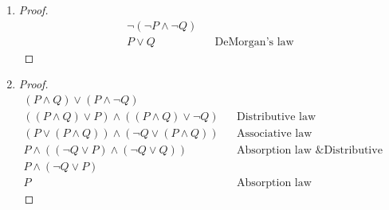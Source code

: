     
    \begin{solution}
        \begin{enumerate}[label=(\alph*)]
            \item {
                \begin{proof}
                    \begin{align*}
                        \neg(\neg P \wedge \neg Q) \\
                        P \vee Q && \text{DeMorgan's law}
                    \end{align*}
                \end{proof}
            }
            
            \item {
                \begin{proof}
                    \begin{align*}
                        (P \wedge Q) \vee (P \wedge \neg Q) \\
                        ((P \wedge Q) \vee P) \wedge ((P \wedge Q) \vee \neg Q) && \text{Distributive law} \\
                        (P \vee (P \wedge Q)) \wedge (\neg Q \vee (P \wedge Q)) && \text{Associative law} \\
                        P \wedge (( \neg Q \vee P) \wedge (\neg Q \vee Q)) && \text{Absorption law \& Distributive law} \\
                        P \wedge (\neg Q \vee P) \\
                        P && \text{Absorption law}
                    \end{align*}
                \end{proof}
            }
            

\end{enumerate}
\end{solution}
